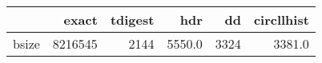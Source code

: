 \begin{tabular}{lrrrrr}
\toprule
{} &    exact &  tdigest &     hdr &    dd &  circllhist \\
\midrule
bsize &  8216545 &     2144 &  5550.0 &  3324 &      3381.0 \\
\bottomrule
\end{tabular}

